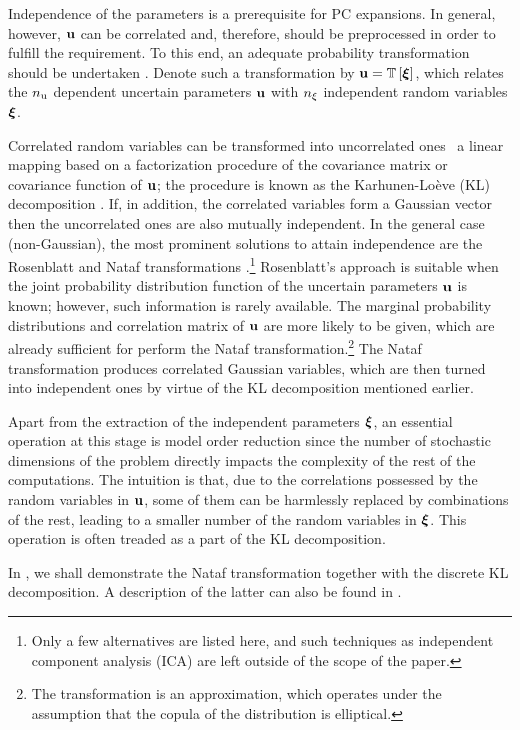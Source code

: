 Independence of the parameters is a prerequisite for PC expansions.
In general, however, $\mathbf{u}$ can be correlated and, therefore, should be preprocessed in order to fulfill the requirement.
To this end, an adequate probability transformation should be undertaken \cite{eldred2008}.
Denote such a transformation by $\vU = \oTransform{\vZ}$, which relates the ${n_\text{u}}$ dependent uncertain parameters $\mathbf{u}$ with ${n_\xi}$ independent random variables $\boldsymbol{\xi}$.

Correlated random variables can be transformed into uncorrelated ones \via\ a linear mapping based on a factorization procedure of the covariance matrix or covariance function of $\mathbf{u}$; the procedure is known as the Karhunen-Lo\`{e}ve (KL) decomposition \cite{ghanem1991}.
If, in addition, the correlated variables form a Gaussian vector then the uncorrelated ones are also mutually independent.
In the general case (non-Gaussian), the most prominent solutions to attain independence are the Rosenblatt \cite{rosenblatt1952} and Nataf transformations \cite{li2008}.\footnote{Only a few alternatives are listed here, and such techniques as independent component analysis (ICA) are left outside of the scope of the paper.}
Rosenblatt's approach is suitable when the joint probability distribution function of the uncertain parameters $\mathbf{u}$ is known; however, such information is rarely available.
The marginal probability distributions and correlation matrix of $\mathbf{u}$ are more likely to be given, which are already sufficient for perform the Nataf transformation.\footnote{The transformation is an approximation, which operates under the assumption that the copula of the distribution is elliptical.}
The Nataf transformation produces correlated Gaussian variables, which are then turned into independent ones by virtue of the KL decomposition mentioned earlier.

Apart from the extraction of the independent parameters $\boldsymbol{\xi}$, an essential operation at this stage is model order reduction since the number of stochastic dimensions of the problem directly impacts the complexity of the rest of the computations.
The intuition is that, due to the correlations possessed by the random variables in $\mathbf{u}$, some of them can be harmlessly replaced by combinations of the rest, leading to a smaller number of the random variables in $\boldsymbol{\xi}$.
This operation is often treaded as a part of the KL decomposition.

In , we shall demonstrate the Nataf transformation together with the discrete KL decomposition.
A description of the latter can also be found in .
